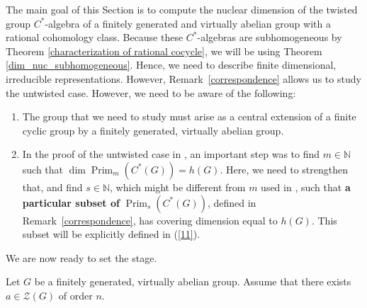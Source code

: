 \documentclass{amsart}
\theoremstyle{definition}
\newcommand{\N}{\mathbb{N}}
\DeclareMathOperator{\Prim}{Prim}
\begin{document}
The main goal of this Section is to compute the nuclear dimension of the twisted group $C^*$-algebra of a finitely generated and virtually abelian group with a rational cohomology class. Because these $C^*$-algebras are subhomogeneous by Theorem \ref{characterization of rational cocycle}, we will be using Theorem \ref{dim_nuc_subhomogeneous}. Hence, we need to describe finite dimensional, irreducible representations. However, Remark~\ref{correspondence} allows us to study the untwisted case. However, we need to be aware of the following:
\begin{enumerate}
    \item The group that we need to study must arise as a central extension of a finite cyclic group by a finitely generated, virtually abelian group. 
    \item In the proof of the untwisted case in \cite{paper_untwisted_case}, an important step was to find $m\in \N$ such that $\dim \Prim_m(C^*(G))=h(G)$. Here, we need to strengthen that, and find $s\in \N$, which might be different from $m$ used in \cite{paper_untwisted_case}, such that \textbf{a particular subset of} $\Prim_{s}(C^*(G))$, defined in Remark~\ref{correspondence}, has covering dimension equal to $h(G)$. This subset will be explicitly defined in (\ref{11}).
\end{enumerate}
We are now ready to set the stage. \par

Let $G$ be a finitely generated, virtually abelian group. Assume that there exists $a\in \mathcal{Z}(G)$ of order $n$.\par
\end{document}
